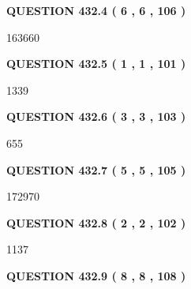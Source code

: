 \documentclass{ctexart}
\begin{document}
 
 
 
  
\vspace{0.2in}
  
{\textbf{\Large{QUESTION
432.4 
 ( 6 , 6 , 106 )
}}}
  
  
 
 
\noindent{}

163660
 
 
  
\vspace{0.2in}
  
{\textbf{\Large{QUESTION
432.5 
 ( 1 , 1 , 101 )
}}}
  
  
 
 
\noindent{}

1339
 
 
  
\vspace{0.2in}
  
{\textbf{\Large{QUESTION
432.6 
 ( 3 , 3 , 103 )
}}}
  
  
 
 
\noindent{}

655
 
 
  
\vspace{0.2in}
  
{\textbf{\Large{QUESTION
432.7 
 ( 5 , 5 , 105 )
}}}
  
  
 
 
\noindent{}

172970
 
 
  
\vspace{0.2in}
  
{\textbf{\Large{QUESTION
432.8 
 ( 2 , 2 , 102 )
}}}
  
  
 
 
\noindent{}

1137
 
 
  
\vspace{0.2in}
  
{\textbf{\Large{QUESTION
432.9 
 ( 8 , 8 , 108 )
}}}
  
\end{document}
